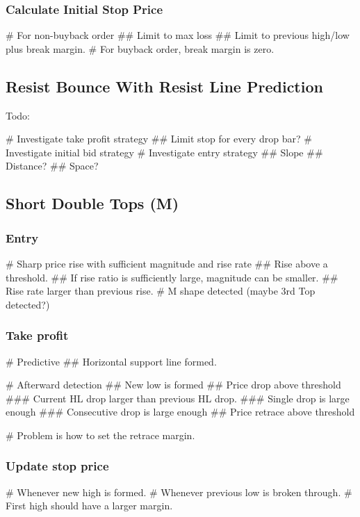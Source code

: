 \subsubsection{Calculate Initial Stop Price}
\begin{listb}
# For non-buyback order
  ## Limit to max loss
  ## Limit to previous high/low plus break margin. 
# For buyback order, break margin is zero.
\end{listb}

\subsection{Resist Bounce With Resist Line Prediction}
Todo: 
\begin{listb}
# Investigate take profit strategy 
  ## Limit stop for every drop bar? 
# Investigate initial bid strategy
# Investigate entry strategy
  ## Slope
  ## Distance? 
  ## Space?  
\end{listb}

\subsection{Short Double Tops (M)}
\subsubsection{Entry}
\begin{listb}
# Sharp price rise with sufficient magnitude and rise rate
  ## Rise above a threshold.
  ## If rise ratio is sufficiently large, magnitude can be smaller. 
  ## Rise rate larger than previous rise. 
# M shape detected (maybe 3rd Top detected?)
\end{listb}

\subsubsection{Take profit}
\begin{listb}
# Predictive
  ## Horizontal support line formed.

# Afterward detection
  ## New low is formed
  ## Price drop above threshold
     ### Current HL drop larger than previous HL drop.
     ### Single drop is large enough
     ### Consecutive drop is large enough
  ## Price retrace above threshold
  
# Problem is how to set the retrace margin.  
\end{listb}

\subsubsection{Update stop price}
\begin{listb}
# Whenever new high is formed.
# Whenever previous low is broken through. 
# First high should have a larger margin. 
\end{listb}


